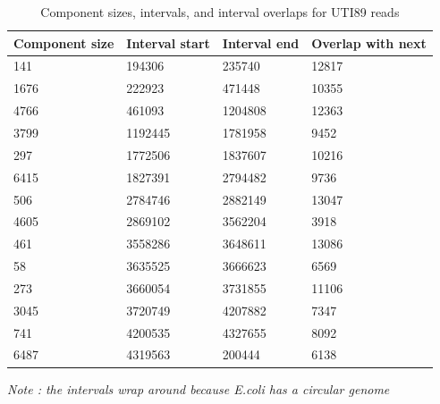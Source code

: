 \begin{table}[]
	\begin{tabular}{|l|l|l|l|}
	\hline
	\textbf{Component size} & \textbf{Interval start} & \textbf{Interval end} & \textbf{Overlap with next} \\ \hline
	141                     & 194306                  & 235740                & 12817                      \\ \hline
	1676                    & 222923                  & 471448                & 10355                      \\ \hline
	4766                    & 461093                  & 1204808               & 12363                      \\ \hline
	3799                    & 1192445                 & 1781958               & 9452                       \\ \hline
	297                     & 1772506                 & 1837607               & 10216                      \\ \hline
	6415                    & 1827391                 & 2794482               & 9736                       \\ \hline
	506                     & 2784746                 & 2882149               & 13047                      \\ \hline
	4605                    & 2869102                 & 3562204               & 3918                       \\ \hline
	461                     & 3558286                 & 3648611               & 13086                      \\ \hline
	58                      & 3635525                 & 3666623               & 6569                       \\ \hline
	273                     & 3660054                 & 3731855               & 11106                      \\ \hline
	3045                    & 3720749                 & 4207882               & 7347                       \\ \hline
	741                     & 4200535                 & 4327655               & 8092                       \\ \hline
	6487                    & 4319563                 & 200444                & 6138                       \\ \hline
	\end{tabular}
\caption{Component sizes, intervals, and interval overlaps for UTI89 reads}
\label{table:comp_intervals_b}
\end{table}
\textit{Note : the intervals wrap around because E.coli has a circular genome}

